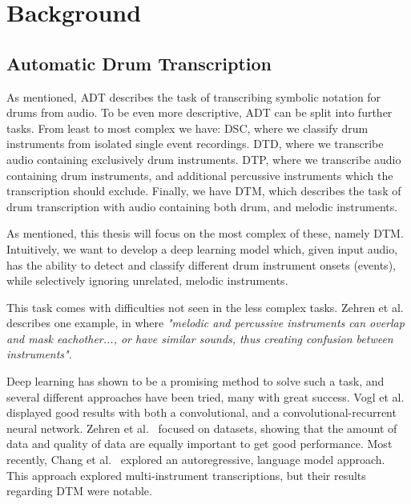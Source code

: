 \chapter{Background}\label{Background}

\section{Automatic Drum Transcription}

As mentioned, \gls{ADT} describes the task of transcribing symbolic notation for drums from audio. To be even more descriptive, \gls{ADT} can be split into further tasks. From least to most complex we have: \gls{DSC}, where we classify drum instruments from isolated single event recordings. \gls{DTD}, where we transcribe audio containing exclusively drum instruments. \gls{DTP}, where we transcribe audio containing drum instruments, and additional percussive instruments which the transcription should exclude. Finally, we have \gls{DTM}, which describes the task of drum transcription with audio containing both drum, and melodic instruments.~\cite{8350302}

As mentioned, this thesis will focus on the most complex of these, namely \gls{DTM}. Intuitively, we want to develop a deep learning model which, given input audio, has the ability to detect and classify different drum instrument onsets (events), while selectively ignoring unrelated, melodic instruments.

This task comes with difficulties not seen in the less complex tasks. Zehren et al.~\cite{signals4040042} describes one example, in where \textit{"melodic and percussive instruments can overlap and mask eachother..., or have similar sounds, thus creating confusion between instruments"}.

Deep learning has shown to be a promising method to solve such a task, and several different approaches have been tried, many with great success. Vogl et al.~\cite{vogl2018multiinstrumentdrumtranscription, Vogl2017DrumTV} displayed good results with both a convolutional, and a convolutional-recurrent neural network. Zehren et al.~\cite{signals4040042, zehren2024analyzingreducingsynthetictorealtransfer} focused on datasets, showing that the amount of data and quality of data are equally important to get good performance. Most recently, Chang et al.~\cite{chang2024yourmt3+} explored an autoregressive, language model approach. This approach explored multi-instrument transcriptions, but their results regarding \gls{DTM} were notable.


